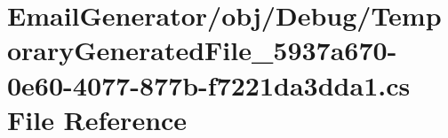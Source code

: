 \hypertarget{_email_generator_2obj_2_debug_2_temporary_generated_file__5937a670-0e60-4077-877b-f7221da3dda1_8cs}{}\section{Email\+Generator/obj/\+Debug/\+Temporary\+Generated\+File\+\_\+5937a670-\/0e60-\/4077-\/877b-\/f7221da3dda1.cs File Reference}
\label{_email_generator_2obj_2_debug_2_temporary_generated_file__5937a670-0e60-4077-877b-f7221da3dda1_8cs}
